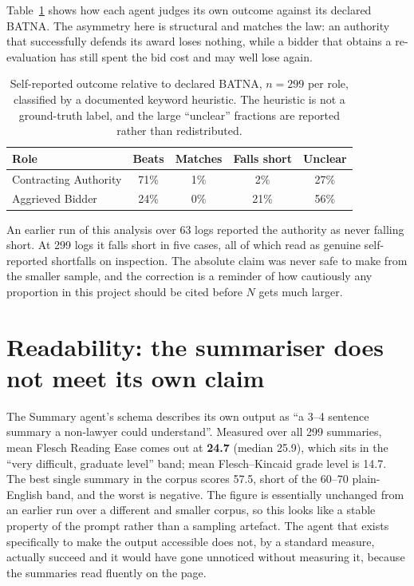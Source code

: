 Table~\ref{tab:batna} shows how each agent judges its own outcome against its
declared BATNA. The asymmetry here is structural and matches the law: an
authority that successfully defends its award loses nothing, while a bidder that
obtains a re-evaluation has still spent the bid cost and may well lose again.

\begin{table}[htbp]
\centering
\footnotesize
\caption[BATNA self-assessment]{Self-reported outcome relative to declared BATNA,
$n=299$ per role, classified by a documented keyword heuristic. The heuristic is
not a ground-truth label, and the large ``unclear'' fractions are reported rather
than redistributed.}
\label{tab:batna}
\begin{tabular}{|l|c|c|c|c|}
\hline
\textbf{Role} & \textbf{Beats} & \textbf{Matches} & \textbf{Falls short} & \textbf{Unclear} \\
\hline
Contracting Authority & 71\% & 1\% & 2\% & 27\% \\
\hline
Aggrieved Bidder & 24\% & 0\% & 21\% & 56\% \\
\hline
\end{tabular}
\end{table}

An earlier run of this analysis over 63 logs reported the authority as never
falling short. At 299 logs it falls short in five cases, all of which
read as genuine self-reported shortfalls on inspection. The absolute claim was
never safe to make from the smaller sample, and the correction is a
reminder of how cautiously any proportion in this project should be cited before
$N$ gets much larger.

\section{Readability: the summariser does not meet its own claim}
\label{sec:readability}

The Summary agent's schema describes its own output as ``a 3--4 sentence summary
a non-lawyer could understand''. Measured over all 299 summaries, mean Flesch
Reading Ease \cite{flesch1948readability} comes out at \textbf{24.7} (median
25.9), which sits in the ``very difficult, graduate level'' band; mean
Flesch--Kincaid grade level \cite{kincaid1975derivation} is 14.7. The best single
summary in the corpus scores 57.5, short of the 60--70 plain-English band,
and the worst is negative. The figure is essentially unchanged from an earlier
run over a different and smaller corpus, so this looks like a stable property of
the prompt rather than a sampling artefact. The agent that exists specifically
to make the output accessible does not, by a standard measure, actually succeed
and it would have gone unnoticed without measuring it, because the summaries
read fluently on the page.

